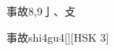 \begin{entry}{事故}{8,9}{⼅、⽁}
  \begin{phonetics}{事故}{shi4gu4}[][HSK 3]
  \end{phonetics}
\end{entry}
